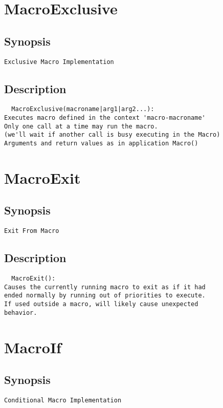 \section{MacroExclusive}
\subsection{Synopsis}
\begin{verbatim}
Exclusive Macro Implementation
\end{verbatim}
\subsection{Description}
\begin{verbatim}
  MacroExclusive(macroname|arg1|arg2...):
Executes macro defined in the context 'macro-macroname'
Only one call at a time may run the macro.
(we'll wait if another call is busy executing in the Macro)
Arguments and return values as in application Macro()

\end{verbatim}


\section{MacroExit}
\subsection{Synopsis}
\begin{verbatim}
Exit From Macro
\end{verbatim}
\subsection{Description}
\begin{verbatim}
  MacroExit():
Causes the currently running macro to exit as if it had
ended normally by running out of priorities to execute.
If used outside a macro, will likely cause unexpected
behavior.

\end{verbatim}


\section{MacroIf}
\subsection{Synopsis}
\begin{verbatim}
Conditional Macro Implementation
\end{verbatim}
